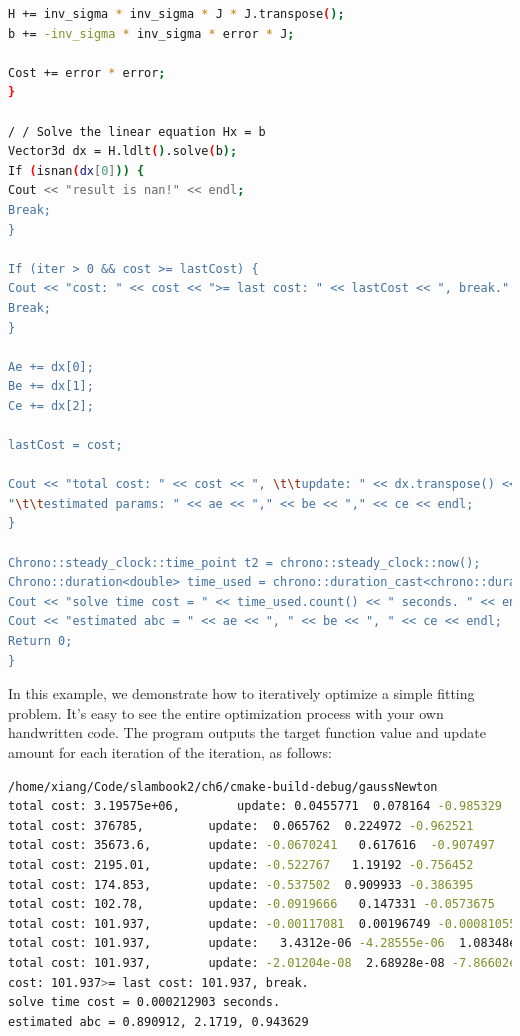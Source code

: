\begin{lstlisting}[language=sh,caption=slambook2/ch6/gaussNewton.cpp]
H += inv_sigma * inv_sigma * J * J.transpose();
b += -inv_sigma * inv_sigma * error * J;

Cost += error * error;
}

/ / Solve the linear equation Hx = b
Vector3d dx = H.ldlt().solve(b);
If (isnan(dx[0])) {
Cout << "result is nan!" << endl;
Break;
}

If (iter > 0 && cost >= lastCost) {
Cout << "cost: " << cost << ">= last cost: " << lastCost << ", break." << endl;
Break;
}

Ae += dx[0];
Be += dx[1];
Ce += dx[2];

lastCost = cost;

Cout << "total cost: " << cost << ", \t\tupdate: " << dx.transpose() <<
"\t\testimated params: " << ae << "," << be << "," << ce << endl;
}

Chrono::steady_clock::time_point t2 = chrono::steady_clock::now();
Chrono::duration<double> time_used = chrono::duration_cast<chrono::duration<double>>(t2 - t1);
Cout << "solve time cost = " << time_used.count() << " seconds. " << endl;
Cout << "estimated abc = " << ae << ", " << be << ", " << ce << endl;
Return 0;
}
\end{lstlisting}

In this example, we demonstrate how to iteratively optimize a simple fitting problem. It's easy to see the entire optimization process with your own handwritten code. The program outputs the target function value and update amount for each iteration of the iteration, as follows:

\begin{lstlisting}[language=sh,caption=Terminal output:]
/home/xiang/Code/slambook2/ch6/cmake-build-debug/gaussNewton
total cost: 3.19575e+06, 		update: 0.0455771  0.078164 -0.985329		estimated params: 2.04558,-0.921836,4.01467
total cost: 376785, 		update:  0.065762  0.224972 -0.962521		estimated params: 2.11134,-0.696864,3.05215
total cost: 35673.6, 		update: -0.0670241   0.617616  -0.907497		estimated params: 2.04432,-0.0792484,2.14465
total cost: 2195.01, 		update: -0.522767   1.19192 -0.756452		estimated params: 1.52155,1.11267,1.3882
total cost: 174.853, 		update: -0.537502  0.909933 -0.386395		estimated params: 0.984045,2.0226,1.00181
total cost: 102.78, 		update: -0.0919666   0.147331 -0.0573675		estimated params: 0.892079,2.16994,0.944438
total cost: 101.937, 		update: -0.00117081  0.00196749 -0.00081055		estimated params: 0.890908,2.1719,0.943628
total cost: 101.937, 		update:   3.4312e-06 -4.28555e-06  1.08348e-06		estimated params: 0.890912,2.1719,0.943629
total cost: 101.937, 		update: -2.01204e-08  2.68928e-08 -7.86602e-09		estimated params: 0.890912,2.1719,0.943629
cost: 101.937>= last cost: 101.937, break.
solve time cost = 0.000212903 seconds.
estimated abc = 0.890912, 2.1719, 0.943629
\end{lstlisting}

